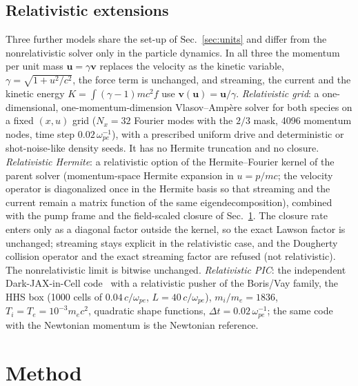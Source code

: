 \documentclass[aps,pre,reprint,floatfix,amsmath,amssymb,nofootinbib,superscriptaddress]{revtex4-2}
\newcommand{\wpe}{\omega_{pe}}
\begin{document}
\subsection{Relativistic extensions}\label{sec:relmodel}
Three further models share the set-up of Sec.~\ref{sec:units} and differ from the nonrelativistic solver only in the particle dynamics. In all three the momentum per unit mass $\mathbf u=\gamma\mathbf v$ replaces the velocity as the kinetic variable, $\gamma=\sqrt{1+u^2/c^2}$, the force term is unchanged, and streaming, the current and the kinetic energy $K=\int(\gamma-1)m c^2f$ use $\mathbf v(\mathbf u)=\mathbf u/\gamma$. \emph{Relativistic grid}: a one-dimensional, one-momentum-dimension Vlasov--Ampère solver for both species on a fixed $(x,u)$ grid ($N_x=32$ Fourier modes with the $2/3$ mask, 4096 momentum nodes, time step $0.02\,\wpe^{-1}$), with a prescribed uniform drive and deterministic or shot-noise-like density seeds. It has no Hermite truncation and no closure. \emph{Relativistic Hermite}: a relativistic option of the Hermite--Fourier kernel of the parent solver (momentum-space Hermite expansion in $u=p/mc$; the velocity operator is diagonalized once in the Hermite basis so that streaming and the current remain a matrix function of the same eigendecomposition), combined with the pump frame and the field-scaled closure of Sec.~\ref{sec:method}. The closure rate enters only as a diagonal factor outside the kernel, so the exact Lawson factor is unchanged; streaming stays explicit in the relativistic case, and the Dougherty collision operator and the exact streaming factor are refused (not relativistic). The nonrelativistic limit is bitwise unchanged. \emph{Relativistic PIC}: the independent Dark-JAX-in-Cell code~\cite{DarkJIC} with a relativistic pusher of the Boris/Vay family, the HHS box (1000 cells of $0.04\,c/\wpe$, $L=40\,c/\wpe$), $m_i/m_e=1836$, $T_i=T_e=10^{-3}m_ec^2$, quadratic shape functions, $\Delta t=0.02\,\wpe^{-1}$; the same code with the Newtonian momentum is the Newtonian reference.


\section{Method}\label{sec:method}
\end{document}

